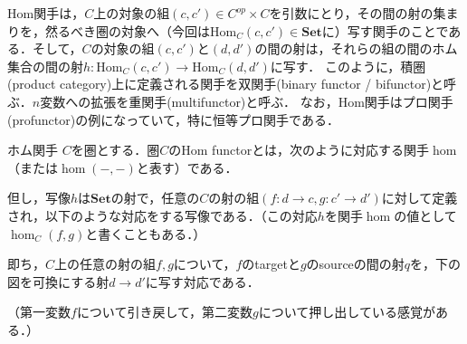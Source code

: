 \documentclass[uplatex, 12pt, dvipdfmx]{jsreport}
\begin{document}
Hom関手は，$C$上の対象の組$(c,c')\in C^{op}\times C$を引数にとり，その間の射の集まりを，然るべき圏の対象へ（今回は$\mathrm{Hom}_C(c,c')\in\mathbf{Set}$に）写す関手のことである．そして，$C$の対象の組$(c,c')$と$(d,d')$の間の射は，それらの組の間のホム集合の間の射$h:\mathrm{Hom}_C(c,c')\to\mathrm{Hom}_C(d,d')$に写す．
このように，積圏(product category)上に定義される関手を双関手(binary functor / bifunctor)と呼ぶ．$n$変数への拡張を重関手(multifunctor)と呼ぶ．
なお，Hom関手はプロ関手(profunctor)の例になっていて，特に恒等プロ関手である．
\begin{definition}{ホム関手}\rm{}
    $C$を圏とする．圏$C$の\textrm{Hom functor}とは，次のように対応する関手$\hom$（または$\hom(-,-)$と表す）である．
    \begin{center}\end{center}
    但し，写像$h$は$\mathbf{Set}$の射で，任意の$C$の射の組$(f:d\to c, g:c'\to d')$に対して定義され，以下のような対応をする写像である．（この対応$h$を関手$\hom$の値として$\hom_C(f,g)$と書くこともある．）
    \begin{center}\end{center}
    即ち，$C$上の任意の射の組$f,g$について，$f$のtargetと$g$のsourceの間の射$q$を，下の図を可換にする射$d\to d'$に写す対応である．
    \begin{center}\end{center}
    （第一変数$f$について引き戻して，第二変数$g$について押し出している感覚がある．）
\end{definition}
\end{document}
